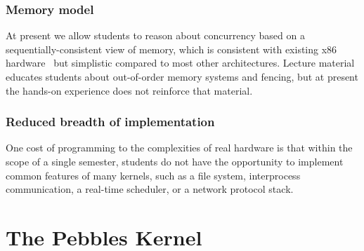\subsubsection{Memory model}

At present we allow students
to reason about concurrency based on a
sequentially-consistent view of
memory, which is consistent with
existing x86 hardware~\cite{SewellSOZNM:x86tso-cacm10}
but simplistic compared to most other
architectures.
Lecture material educates students about
out-of-order memory systems
and fencing,
but at present the hands-on experience does not
reinforce that material.

\subsubsection{Reduced breadth of implementation}

One cost of programming to the complexities of
real hardware is that
within the scope of a single semester,
students do not have the opportunity to
implement common features of many kernels,
such as a file system, interprocess communication,
a real-time scheduler,
or a network protocol stack.

\section{The Pebbles Kernel}
\label{sec:pebbles}

